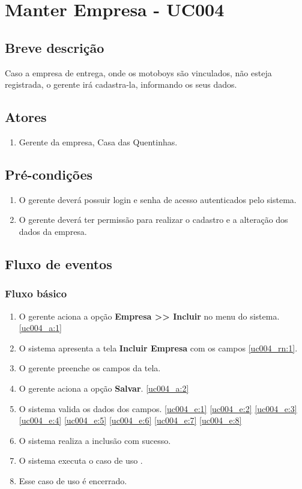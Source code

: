 \chapter{Manter Empresa - UC004} \label{uc004}

\section{Breve descrição}

Caso a empresa de entrega, onde os motoboys são vinculados, não esteja registrada, o gerente irá cadastra-la, informando os seus dados.

\section{Atores}

\begin{enumerate}
	\item Gerente da empresa, Casa das Quentinhas.
\end{enumerate}

\section{Pré-condições}

\begin{enumerate}
	\item O gerente deverá possuir login e senha de acesso autenticados pelo sistema.
	\item O gerente deverá ter permissão para realizar o cadastro e a alteração dos dados da empresa.
\end{enumerate}

\section{Fluxo de eventos}

\subsection{Fluxo básico}

\begin{enumerate}[label=P\arabic*]
	\item O gerente aciona a opção \textbf{Empresa >> Incluir} no menu do sistema. \label{uc004_p:1}\ref{uc004_a:1}
	\item O sistema apresenta a tela \textbf{Incluir Empresa} com os campos \ref{uc004_rn:1}. \label{uc004_p:2}
	\item O gerente preenche os campos da tela. \label{uc004_p:3}
	\item O gerente aciona a opção \textbf{Salvar}. \label{uc004_p:4}\ref{uc004_a:2}
	\item O sistema valida os dados dos campos. \ref{uc004_e:1} \ref{uc004_e:2} \ref{uc004_e:3} \ref{uc004_e:4} \ref{uc004_e:5} \ref{uc004_e:6} \ref{uc004_e:7} \ref{uc004_e:8}
	\item O sistema realiza a inclusão com sucesso.
	\item O sistema executa o caso de uso .
	\item Esse caso de uso é encerrado.	
\end{enumerate}

